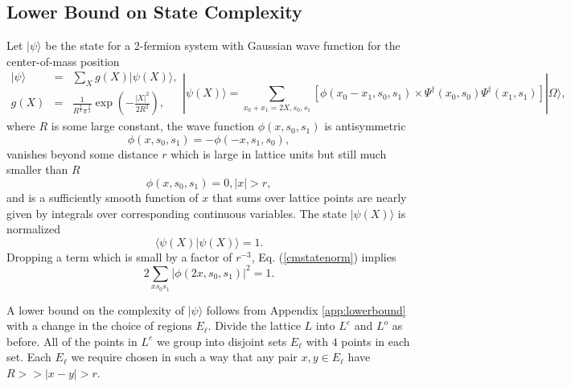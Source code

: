 \documentclass[12pt,amsmath,amssymb,onecolumn]{revtex4-2}
\begin{document}
\subsection{\label{sec:lowerboundnew} Lower Bound on State Complexity}

Let $|\psi \rangle $ be the state for a 2-fermion system with Gaussian wave function for the center-of-mass position 
\begin{subequations}
\begin{eqnarray}
\label{netstate}
|\psi \rangle  &=& \sum_X g(X)|\psi(X) \rangle , \\
\label{gaussianstate}
g(X) &=&  \frac{1}{R^\frac{3}{2} \pi^\frac{3}{4}} \exp( -\frac{|X|^2}{2R^2}), 
\end{eqnarray}
\begin{equation}
\label{cmstate}
|\psi(X) \rangle  =  \sum_{x_0 + x_1 = 2X, s_0, s_1}[ \phi(x_0 - x_1, s_0, s_1) \times 
 \Psi^\dagger( x_0, s_0) \Psi^\dagger(x_1, s_1)] |\Omega \rangle ,
\end{equation}
\end{subequations}
where $R$ is some large constant,
the wave function $\phi(x, s_0, s_1)$ is antisymmetric
\begin{equation}
\label{antisymm}
\phi( x, s_0, s_1) = -\phi( -x, s_1, s_0),
\end{equation}
vanishes beyond some distance
$r$ which is large in lattice units but still much smaller than $R$
\begin{equation}
\label{range}
\phi( x, s_0, s_1) = 0, |x| > r, 
\end{equation}
and is a sufficiently smooth function of $x$ that 
sums over
lattice points are nearly given by integrals over corresponding
continuous variables.
The state $|\psi(X) \rangle $ is normalized
\begin{equation}
\label{cmstatenorm}
 \langle  \psi( X) | \psi( X) \rangle  = 1.
\end{equation}
Dropping a term which is small by a factor of $r^{-3}$, Eq. (\ref{cmstatenorm}) implies
\begin{equation}
\label{cmstatenorm1}
2 \sum_{x s_0 s_1} |\phi(2 x, s_0, s_1)|^2 = 1.
\end{equation}



A lower bound on the complexity of $|\psi \rangle $ follows from Appendix \ref{app:lowerbound} 
with a change in the choice of regions $E_\ell$. Divide the lattice $L$ into $L^e$
and $L^o$ as before. All of the points in $L^e$ we group into disjoint sets $E_\ell$ with $4$ points
in each set. Each $E_\ell$ we require chosen in such a way that any pair $x, y \in E_\ell$ have
$R >> |x - y| > r$. 
\end{document}
